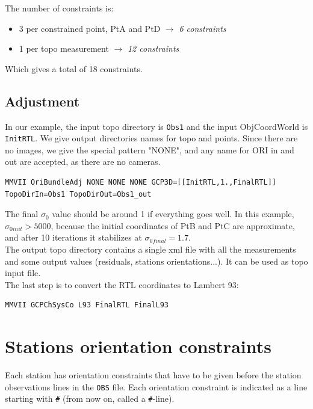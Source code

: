 The number of constraints is:
\begin{itemize}
   \item 3 per constrained point, PtA and PtD  $\rightarrow$ \textit{6 constraints}
   \item 1 per topo measurement $\rightarrow$ \textit{12 constraints}
\end{itemize}

Which gives a total of 18 constraints.


\subsection{Adjustment}

In our example, the input topo directory is \texttt{Obs1} and the input ObjCoordWorld is \texttt{InitRTL}.
We give output directories names for topo and points.
Since there are no images, we give the special pattern "NONE", and any name for ORI in and out are accepted, as there are no cameras.

\begin{lstlisting}
MMVII OriBundleAdj NONE NONE NONE GCP3D=[[InitRTL,1.,FinalRTL]] TopoDirIn=Obs1 TopoDirOut=Obs1_out
\end{lstlisting}

The final $\sigma_0$ value should be around 1 if everything goes well.
In this example, $\sigma_{0 init} > 5000$, because the initial coordinates of PtB and PtC are approximate,
and after 10 iterations it stabilizes at $\sigma_{0 final} = 1.7$.
\\

The output topo directory contains a single xml file with all the measurements and some output values (residuals,
stations orientations...). It can be used as topo input file.
\\

The last step is to convert the RTL coordinates to Lambert 93:

\begin{lstlisting}
MMVII GCPChSysCo L93 FinalRTL FinalL93
\end{lstlisting}


\section{Stations orientation constraints}

Each station has orientation constraints that have to be given before the station observations lines in the \texttt{OBS} file.
Each orientation constraint is indicated as a line starting with \texttt{\#} (from now on, called a \texttt{\#}-line).
\\


